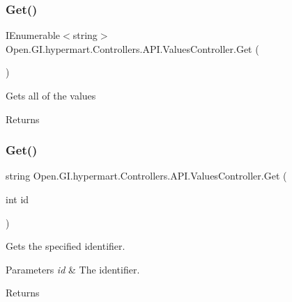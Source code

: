 \subsubsection{\texorpdfstring{Get()}{Get()}\hspace{0.1cm}{\footnotesize\ttfamily [1/2]}}
{\footnotesize\ttfamily I\+Enumerable$<$string$>$ Open.\+G\+I.\+hypermart.\+Controllers.\+A\+P\+I.\+Values\+Controller.\+Get (\begin{DoxyParamCaption}{ }\end{DoxyParamCaption})}



Gets all of the values 

\begin{DoxyReturn}{Returns}

\end{DoxyReturn}
\hypertarget{class_open_1_1_g_i_1_1hypermart_1_1_controllers_1_1_a_p_i_1_1_values_controller_a939097635499ed1d2f82186a1d85d2d4}{}\label{class_open_1_1_g_i_1_1hypermart_1_1_controllers_1_1_a_p_i_1_1_values_controller_a939097635499ed1d2f82186a1d85d2d4} 
\subsubsection{\texorpdfstring{Get()}{Get()}\hspace{0.1cm}{\footnotesize\ttfamily [2/2]}}
{\footnotesize\ttfamily string Open.\+G\+I.\+hypermart.\+Controllers.\+A\+P\+I.\+Values\+Controller.\+Get (\begin{DoxyParamCaption}\item[{int}]{id }\end{DoxyParamCaption})}



Gets the specified identifier. 


\begin{DoxyParams}{Parameters}
{\em id} & The identifier.\\
\hline
\end{DoxyParams}
\begin{DoxyReturn}{Returns}

\end{DoxyReturn}
\hypertarget{class_open_1_1_g_i_1_1hypermart_1_1_controllers_1_1_a_p_i_1_1_values_controller_a0f58764e60950048b68217098361ea62}{}\label{class_open_1_1_g_i_1_1hypermart_1_1_controllers_1_1_a_p_i_1_1_values_controller_a0f58764e60950048b68217098361ea62} 
